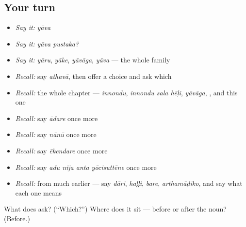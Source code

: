 \subsection*{Your turn}
\begin{itemize}
\raggedright
  \item \emph{Say it:} \emph{yāva}
  \item \emph{Say it:} \emph{yāva pustaka?}
  \item \emph{Say it:} \emph{yāru}, \emph{yāke}, \emph{yāvāga}, \emph{yāva} — the whole family
  \item \emph{Recall:} say \emph{athavā}, then offer a choice and ask which
  \item \emph{Recall:} the whole chapter — \emph{innondu}, \emph{innondu sala hēḷi}, \emph{yāvāga}, \emph{}, and this one
  \item \emph{Recall:} say \emph{ādare} once more
  \item \emph{Recall:} say \emph{nānū} once more
  \item \emph{Recall:} say \emph{ēkendare} once more
  \item \emph{Recall:} say \emph{adu nija anta yōcisuttēne} once more
  \item \emph{Recall:} from much earlier — say \emph{dāri}, \emph{haḷḷi}, \emph{bare}, \emph{arthamāḍiko}, and say what each one means
\end{itemize}

\begin{tcolorbox}[breakable,colback=teal!4,colframe=teal!35!black,title={Before you move on}]
What does  ask? (\textquotedblleft{}Which?\textquotedblright{}) Where does it sit — before or after the noun? (Before.)
\end{tcolorbox}
